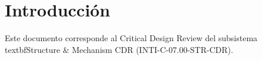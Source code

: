 \section{Introducción}
Este documento corresponde al Critical Design Review del subsistema \\textbf{Structure & Mechanism CDR} (INTI-C-07.00-STR-CDR).
